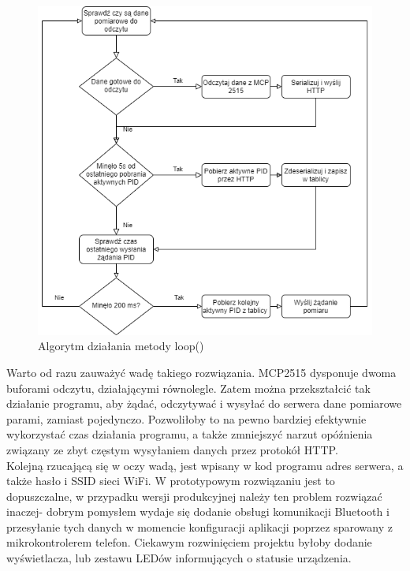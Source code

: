 \documentclass[10pt,a4paper]{scrartcl}
\begin{document}
		\begin{figure}[H]
			\centering
			\includegraphics[width=0.5\linewidth]{main_loop.drawio}
			\caption[Algorytm działania metody loop()]{Algorytm działania metody loop()}
			\label{fig:mainloop}
		\end{figure}
		Warto od razu zauważyć wadę takiego rozwiązania. MCP2515 dysponuje dwoma buforami odczytu, działającymi równolegle. Zatem można przekształcić tak działanie programu, aby żądać, odczytywać i wysyłać do serwera dane pomiarowe parami, zamiast pojedynczo. Pozwoliłoby to na pewno bardziej efektywnie wykorzystać czas działania programu, a także zmniejszyć narzut opóźnienia związany ze zbyt częstym wysyłaniem danych przez protokół HTTP.\\
		Kolejną rzucającą się w oczy wadą, jest wpisany w kod programu adres serwera, a także hasło i SSID sieci WiFi. W prototypowym rozwiązaniu jest to dopuszczalne, w przypadku wersji produkcyjnej należy ten problem rozwiązać inaczej- dobrym pomysłem wydaje się dodanie obsługi komunikacji Bluetooth i przesyłanie tych danych w momencie konfiguracji aplikacji poprzez sparowany z mikrokontrolerem telefon. Ciekawym rozwinięciem projektu byłoby dodanie wyświetlacza, lub zestawu LEDów informujących o statusie urządzenia.
		
\end{document}
